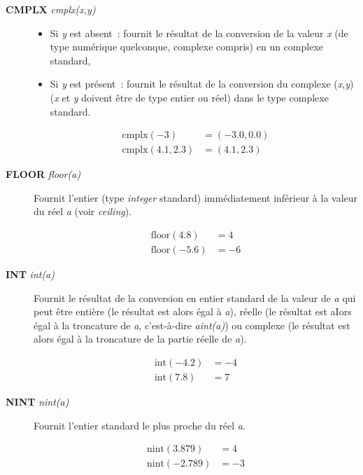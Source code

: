 \documentclass[a4paper,twoside]{article}
\begin{document}
\begin{description}
\item[\textbf{CMPLX } \emph{cmplx(x,y)}] 
\begin{itemize}
\item Si \emph{y} est absent~: fournit le résultat de la conversion de la valeur \emph{x} (de type numérique quelconque, complexe compris) en un complexe standard, 
\item Si \emph{y} est présent~: fournit le résultat de la conversion du complexe (\emph{x},\emph{y}) (\emph{x} et \emph{y} doivent être de type entier ou réel) dans le type complexe standard. 
\end{itemize}
\begin{exemple}
\begin{align}
\mathrm{cmplx}(-3) &= (-3.0,0.0)\\
\mathrm{cmplx}(4.1,2.3) &= (4.1,2.3)
\end{align}
\end{exemple}

\item[\textbf{FLOOR} \emph{floor(a)}] Fournit l'entier (type \emph{integer} standard) immédiatement inférieur à la valeur du réel \emph{a} (voir \emph{ceiling}). 
\begin{exemple}
\begin{align}
\mathrm{floor}(4.8)  &= 4\\
\mathrm{floor}(-5.6)  &= -6
\end{align}
\end{exemple}

\item[\textbf{INT} \emph{int(a)}] Fournit le résultat de la conversion en entier standard de la valeur de \emph{a} qui peut être entière (le résultat est alors égal à \emph{a}), réelle (le résultat est aIors égal à la troncature de \emph{a}, c'est-à-dire \emph{aint(a)}) ou complexe (le résultat est alors égal à la troncature de la partie réelle de \emph{a}). 
\begin{exemple}
\begin{align}
\mathrm{int}(-4.2)  &= -4\\
\mathrm{int}(7.8)  &= 7
\end{align}
\end{exemple}

\item[\textbf{NINT} \emph{nint(a)}] Fournit l'entier standard le plus proche du réel \emph{a}. 
\begin{exemple}
\begin{align}
\mathrm{nint}(3.879)  &= 4\\
\mathrm{nint}(-2.789)  &= -3
\end{align}
\end{exemple}


\end{description}
\end{document}

